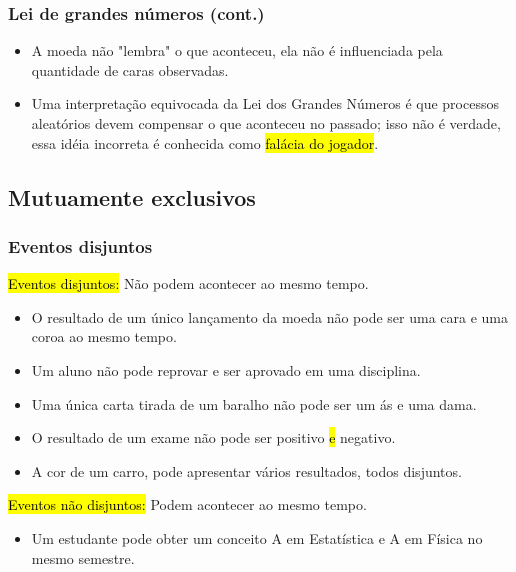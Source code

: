 \begin{frame}
\frametitle{Lei de grandes números (cont.)}
\justifying

\begin{itemize}
\item  A moeda não  "lembra" o que aconteceu, ela não é influenciada pela quantidade de caras observadas.
\justifying
\item Uma interpretação equivocada da Lei dos Grandes Números é que processos aleatórios devem compensar o que aconteceu no passado; isso não é verdade, essa idéia incorreta é conhecida como \hl{falácia do jogador}.
\end{itemize}

\end{frame}


\subsection{Mutuamente exclusivos}


\begin{frame}
\frametitle{Eventos disjuntos}
\justifying
\hl{Eventos disjuntos:} Não podem acontecer ao mesmo tempo.
\begin{itemize}
\justifying
\item O resultado de um único lançamento da moeda não pode ser uma cara e uma coroa ao mesmo tempo.
\justifying
\item Um aluno não pode reprovar e ser aprovado em uma disciplina.
\justifying
\item Uma única carta tirada de um baralho não pode ser um ás e uma dama.
\justifying
\item O resultado de um exame não pode ser positivo \hl{e} negativo.
\justifying
\item A cor de um carro, pode apresentar vários resultados, todos disjuntos.
\end{itemize}

\pause
\justifying
\hl{Eventos não disjuntos:} Podem acontecer ao mesmo tempo.
\begin{itemize}
\justifying
\item Um estudante pode obter um conceito A em Estatística e A em Física no mesmo semestre.
\end{itemize}

\end{frame}

